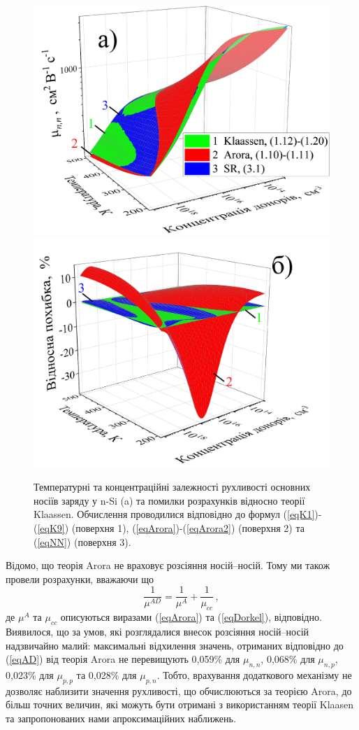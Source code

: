 \documentclass[12pt,a4paper,titlepage,oneside]{book}
\numberwithin{equation}{part}
\begin{document}
\begin{figure}
	\centering
     \includegraphics[width=0.49\linewidth]{Fig37a.png}\kern 20pt
     \includegraphics[width=0.49\linewidth]{Fig37b.png}
	  \caption{Температурні та концентраційні залежності рухливості основних носіїв заряду у n-Si (a)
       та помилки розрахунків відносно теорії Klaassen.
       Обчислення проводилися відповідно до формул (\ref{eqK1})-(\ref{eqK9}) (поверхня 1),
       (\ref{eqArora})-(\ref{eqArora2}) (поверхня 2)  та (\ref{eqNN}) (поверхня 3).
}\label{figLast}
\end{figure}

Відомо, що теорія Arora не враховує розсіяння носій--носій.
Тому ми також провели розрахунки, вважаючи що
\begin{equation}\label{eqAD}
  \frac{1}{\mu^{AD}}= \frac{1}{\mu^A}+\frac{1}{\mu_{cc}}\,,
\end{equation}
де
$\mu^A$ та $\mu_{cc}$ описуються виразами (\ref{eqArora}) та (\ref{eqDorkel}), відповідно.
Виявилося, що за умов, які розглядалися внесок розсіяння носій--носій надзвичайно малий:
максимальні відхилення значень, отриманих відповідно до (\ref{eqAD}) від теорія Arora
не перевищують 0,059\% для $\mu_{n,n}$, 0,068\% для $\mu_{n,p}$, 0,023\% для $\mu_{p,p}$ та
0,028\% для $\mu_{p,n}$.
Тобто, врахування додаткового механізму не дозволяє наблизити значення рухливості,
що обчислюються за теорією Arora, до більш точних величин, які можуть бути отримані з використанням теорії Klaasen
та запропонованих нами апроксимаційних наближень.
\end{document}
